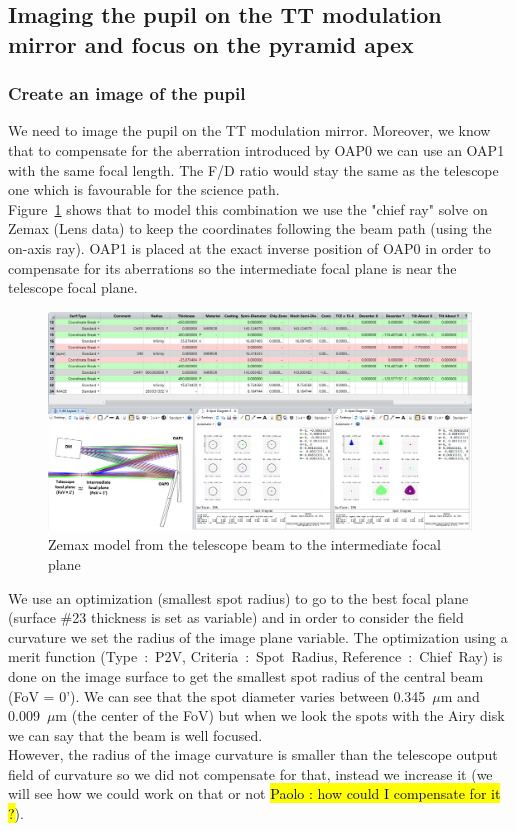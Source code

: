 \documentclass[12pt,a4paper]{article}
\begin{document}
\subsection{Imaging the pupil on the TT modulation mirror and focus on the pyramid apex}

\subsubsection{Create an image of the pupil}
We need to image the pupil on the TT modulation mirror. Moreover, we know that to compensate for the aberration introduced by OAP0 we can use an OAP1 with the same focal length. The F/D ratio would stay the same as the telescope one which is favourable for the science path.\\
Figure~\ref{fig:Zemax_model_FP_OAP1} shows that to model this combination we use the "chief ray" solve on Zemax (Lens data) to keep the coordinates following the beam path (using the on-axis ray). OAP1 is placed at the exact inverse position of OAP0 in order to compensate for its aberrations so the intermediate focal plane is near the telescope focal plane.\\

\begin{figure}[H]
	\begin{center}
		\includegraphics[width=\textwidth]{images/Zemax_model_FP_OAP1.PNG}
		\caption{Zemax model from the telescope beam to the intermediate focal plane}\label{fig:Zemax_model_FP_OAP1}
	\end{center}
\end{figure}
We use an optimization (smallest spot radius) to go to the best focal plane (surface \#23 thickness is set as variable) and in order to consider the field curvature we set the radius of the image plane variable. The optimization using a merit function (Type~:~P2V, Criteria~:~Spot~Radius, Reference~:~Chief~Ray) is done on the image surface to get the smallest spot radius of the central beam (FoV = 0'). We can see that the spot diameter varies between 0.345~$\mu$m and 0.009~$\mu$m (the center of the FoV) but when we look the spots with the Airy disk we can say that the beam is well focused.\\
However, the radius of the image curvature is smaller than the telescope output field of curvature so we did not compensate for that, instead we increase it (we will see how we could work on that or not \hl{Paolo : how could I compensate for it ?}).\\
\end{document}
